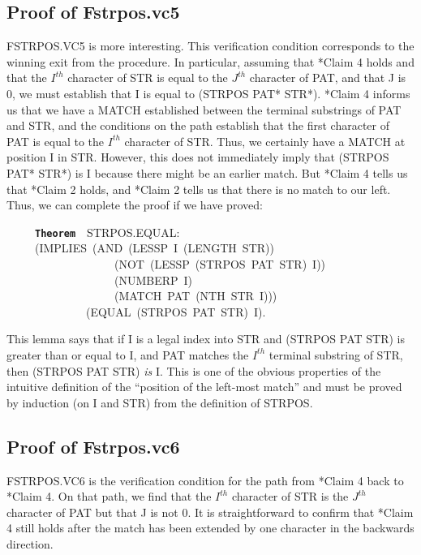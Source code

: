 \documentclass[11pt]{book}
\newenvironment{pubasis}{\begin{flushleft}\ttfamily\small}{\normalsize\rmfamily\end{flushleft}}
\newcommand{\axiomordefinition}[1]{\vspace{6pt}\texttt{\textbf{#1}}}
\newcommand{\pubinlineunderline}[1]{\emph{#1}}
\newcommand{\pubdefaulttextsize}{\large}
\begin{document}
\subsection{Proof of Fstrpos.vc5}
\pubdefaulttextsize
FSTRPOS.VC5 is more interesting.  This verification condition
corresponds to the winning exit from the procedure.  In particular,
assuming that *Claim 4 holds and that the $I^{th}$ character
of STR is equal to the $J^{th}$ character of PAT, and that J is 0,
we must establish that I is equal to (STRPOS PAT* STR*).  *Claim 4
informs us that we have a MATCH established between the terminal
substrings of PAT and STR, and the conditions on the path
establish that the first character of PAT is equal to the $I^{th}$ character of STR.
Thus, we certainly have a MATCH at position I in STR.  However, this
does not immediately imply that (STRPOS PAT* STR*) is I because there
might be an earlier match.  But *Claim 4 tells us that
*Claim 2 holds, and *Claim 2 tells us that there is no match to our left.
Thus, we can complete the proof if we have proved:
\begin{pubasis}
~~~~~\axiomordefinition{Theorem}~~STRPOS.EQUAL:\\
~~~~~(IMPLIES~(AND~(LESSP~I~(LENGTH~STR))\\
~~~~~~~~~~~~~~~~~~~(NOT~(LESSP~(STRPOS~PAT~STR)~I))\\
~~~~~~~~~~~~~~~~~~~(NUMBERP~I)\\
~~~~~~~~~~~~~~~~~~~(MATCH~PAT~(NTH~STR~I)))\\
~~~~~~~~~~~~~~(EQUAL~(STRPOS~PAT~STR)~I).\\
\end{pubasis}
This lemma says that if I is a legal index into STR and (STRPOS PAT STR)
is greater than or equal to I, and PAT matches the $I^{th}$ terminal substring
of STR, then (STRPOS PAT STR) \pubinlineunderline{is} I.  This is one of the obvious properties
of the intuitive definition of the ``position of the left-most match''
and must be proved by induction (on I and STR) from the definition of
STRPOS.
\subsection{Proof of Fstrpos.vc6}
\pubdefaulttextsize
FSTRPOS.VC6 is the verification condition for the path from *Claim 4 back to *Claim 4.
On that path, we find that the $I^{th}$ character of STR is
the $J^{th}$ character of PAT but that J is not 0.
It is straightforward to confirm that *Claim 4 still holds after
the match has been extended by one character in the backwards direction.
\end{document}
